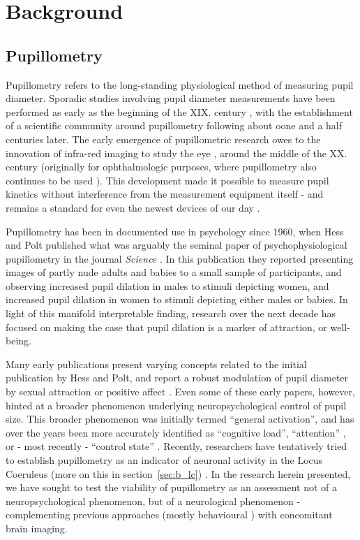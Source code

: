 \chapter{Background}
    \section{Pupillometry}\label{sec:b_p}
	Pupillometry refers to the long-standing physiological method of measuring pupil diameter.
	Sporadic studies involving pupil diameter measurements have been performed as early as the beginning of the XIX. century \cite{Loewenfeld1958},
	with the establishment of a scientific community around pupillometry following about oone and a half centuries later.
	The early emergence of pupillometric research owes to the innovation of infra-red imaging to study the eye \cite{Dubois1955}, around the middle of the XX. century (originally for ophthalmologic purposes, where pupillometry also continues to be used \cite{Thompson2012}).
	This development made it possible to measure pupil kinetics without interference from the measurement equipment itself - and remains a standard for even the newest devices of our day \cite{Bradley2010}.
	
	Pupillometry has been in documented use in psychology since 1960, when Hess and Polt published what was arguably the seminal paper of psychophysiological pupillometry in the journal \textit{Science} \cite{HESS1960}.
	In this publication they reported presenting images of partly nude adults and babies to a small sample of participants, and observing increased pupil dilation in males to stimuli depicting women, and increased pupil dilation in women to stimuli depicting either males or babies.
	In light of this manifold interpretable finding, research over the next decade has focused on making the case that pupil dilation is a marker of attraction, or well-being.
	
	Many early publications present varying concepts related to the initial publication by Hess and Polt, and report a robust modulation of pupil diameter by sexual attraction \cite{Goldwater1972, HESS1965} or positive affect \cite{Nunally1967, Bradshaw1967}.
	Even some of these early papers, however, hinted at a broader phenomenon underlying neuropsychological control of pupil size.
	This broader phenomenon was initially termed “general activation”\cite{Nunally1967}, and has over the years been more accurately identified as “cognitive load”\cite{Zekveld2011}, “attention” \cite{Wykowska2013,Kraemer2000}, or - most recently - “control state” \cite{Hayes2013}.
	Recently, researchers have tentatively tried to establish pupillometry as an indicator of neuronal activity in the Locus Coeruleus (more on this in section~\ref{sec:b_lc}) \cite{Gilzenrat2010}.
	In the research herein presented, we have sought to test the viability of pupillometry as an assessment not of a neuropsychological phenomenon, but of a neurological phenomenon - 
	complementing previous approaches\cite{Gilzenrat2010} (mostly behavioural \cite{Granholm2004}) with concomitant brain imaging.
	
